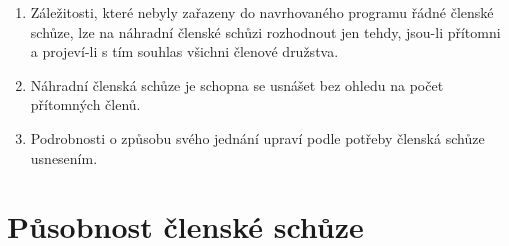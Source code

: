 \begin{enumerate}
    \item Záležitosti, které nebyly zařazeny do navrhovaného programu řádné členské schůze, lze na náhradní členské schůzi rozhodnout jen tehdy, jsou-li přítomni a projeví-li s tím souhlas všichni členové družstva.
    \item Náhradní členská schůze je schopna se usnášet bez ohledu na počet přítomných členů.
    \item Podrobnosti o způsobu svého jednání upraví podle potřeby členská schůze usnesením.
\end{enumerate}

\section{Působnost členské schůze}
